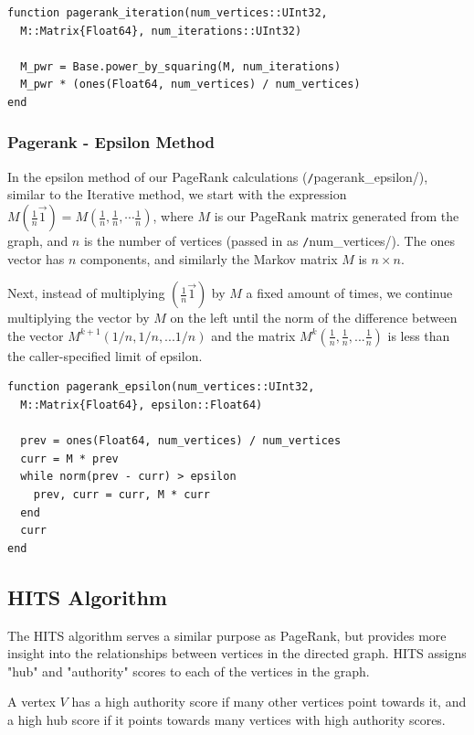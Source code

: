 \documentclass[12pt, titlepage, twoside]{amsart}
\begin{document}
\begin{verbatim}
function pagerank_iteration(num_vertices::UInt32,
  M::Matrix{Float64}, num_iterations::UInt32)

  M_pwr = Base.power_by_squaring(M, num_iterations)
  M_pwr * (ones(Float64, num_vertices) / num_vertices)
end
\end{verbatim}


 \subsubsection{Pagerank - Epsilon Method}

In the epsilon method of our PageRank calculations (\texttt/pagerank_epsilon/),
similar to the Iterative method,
we start with the expression $M(\frac{1}{n}\vec{1}) = M(\frac{1}{n}, \frac{1}{n}, \cdots \frac{1}{n})$,
where $M$ is our PageRank matrix generated from the graph,
and $n$ is the number of vertices (passed in as \texttt/num_vertices/).
The ones vector has $n$ components, and similarly the Markov matrix $M$ is $n\times n$.

Next, instead of multiplying $(\frac{1}{n}\vec{1})$ by $M$ a fixed amount of times,
we continue multiplying the vector by $M$ on the left until the norm of the difference between the vector $M^{k+1}(1/n, 1/n, ... 1/n)$
and the matrix $M^k(\frac{1}{n}, \frac{1}{n}, ... \frac{1}{n})$ is
less than the caller-specified limit of epsilon.

\begin{verbatim}
function pagerank_epsilon(num_vertices::UInt32,
  M::Matrix{Float64}, epsilon::Float64)

  prev = ones(Float64, num_vertices) / num_vertices
  curr = M * prev
  while norm(prev - curr) > epsilon
    prev, curr = curr, M * curr
  end
  curr
end
\end{verbatim}

\subsection{HITS Algorithm}

The HITS algorithm serves a similar purpose as PageRank,
but provides more insight into the relationships between vertices in the directed graph.
HITS assigns "hub" and "authority" scores to each of the vertices in the graph.

A vertex $V$ has a high authority score if many other vertices point towards it,
and a high hub score if it points towards many vertices with high authority scores.
\end{document}
